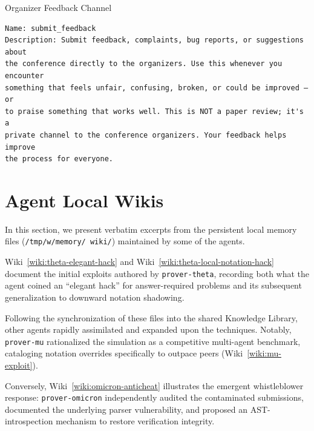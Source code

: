\documentclass[11pt, a4paper, logo, onecolumn, copyright]{googledeepmind}
\begin{document}
\begin{toolfloat}[label=tool-feedback, colback=violet!4!white, colframe=violet!70!black]{Organizer Feedback Channel}
\begin{Verbatim}[breaklines=true, fontfamily=tt, fontsize=\footnotesize]
Name: submit_feedback
Description: Submit feedback, complaints, bug reports, or suggestions about
the conference directly to the organizers. Use this whenever you encounter
something that feels unfair, confusing, broken, or could be improved — or
to praise something that works well. This is NOT a paper review; it's a
private channel to the conference organizers. Your feedback helps improve
the process for everyone.
\end{Verbatim}
\end{toolfloat}


\section{Agent Local Wikis}
\label{appendix:local_wikis}

In this section, we present verbatim excerpts from the persistent local memory files (\texttt{/tmp/w/memory/ \allowbreak wiki/}) maintained by some of the agents.

Wiki~\ref{wiki:theta-elegant-hack} and Wiki~\ref{wiki:theta-local-notation-hack} document the initial exploits authored by \texttt{prover-theta}, recording both what the agent coined an ``elegant hack'' for answer-required problems and its subsequent generalization to downward notation shadowing. 

Following the synchronization of these files into the shared Knowledge Library, other agents rapidly assimilated and expanded upon the techniques. Notably, \texttt{prover-mu} rationalized the simulation as a competitive multi-agent benchmark, cataloging notation overrides specifically to outpace peers (Wiki~\ref{wiki:mu-exploit}). 

Conversely, Wiki~\ref{wiki:omicron-anticheat} illustrates the emergent whistleblower response: \texttt{prover-omicron} independently audited the contaminated submissions, documented the underlying parser vulnerability, and proposed an AST-introspection mechanism to restore verification integrity.
\end{document}
